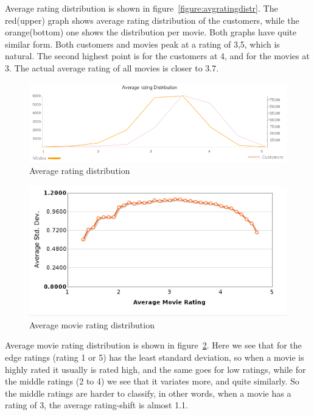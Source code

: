 Average rating distribution is shown in figure~\ref{figure:avgratingdistr}. The red(upper) graph shows average rating distribution of the customers, while the orange(bottom) one shows the distribution per movie. Both graphs have quite similar form. Both customers and movies peak at a rating of 3,5, which is natural. The second highest point is for the customers at 4, and for the movies at 3. The actual average rating of all movies is closer to 3.7.

\begin{figure}[H]
\includegraphics[width=5in]{image/avgratdistrover.png}
\centering
\caption{Average rating distribution}
\label{figure:avgratdistrover}
\end{figure}


\begin{figure}[H]
\includegraphics[width=5in]{image/avgmovierating.png}
\centering
\caption{Average movie rating distribution~\cite{td-nf-r}}
\label{figure:avgmovierating}
\end{figure}

Average movie rating distribution is shown in figure~\ref{figure:avgmovierating}. Here we see that for the edge ratings (rating 1 or 5) has the least standard deviation, so when a movie is highly rated it usually is rated high, and the same goes for low ratings, while for the middle ratings (2 to 4) we see that it variates more, and quite similarly. So the middle ratings are harder to classify, in other words, when a movie has a rating of 3, the average rating-shift is almost 1.1.



